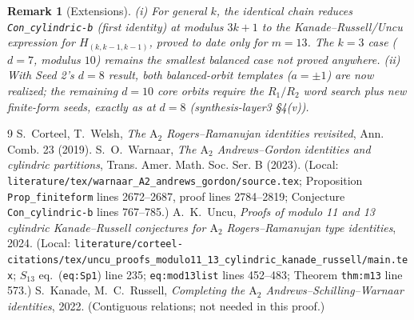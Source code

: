 \documentclass[11pt]{article}
\newtheorem{remark}[theorem]{Remark}
\begin{document}
\begin{remark}[Extensions]
(i) For general $k$, the identical chain reduces
\texttt{Con\_cylindric-b} (first identity) at modulus $3k+1$ to the
Kanade--Russell/Uncu expression for $H_{(k,k-1,k-1)}$, proved to date
only for $m=13$. The $k=3$ case ($d=7$, modulus $10$) remains the
smallest balanced case not proved anywhere.
(ii) With Seed 2's $d=8$ result, both balanced-orbit templates
($a=\pm1$) are now realized; the remaining $d=10$ core orbits require
the $R_1/R_2$ word search plus new finite-form seeds, exactly as at
$d=8$ (synthesis-layer3 \S4(v)).
\end{remark}

\begin{thebibliography}{9}
 S.~Corteel, T.~Welsh,
\emph{The $\mathrm{A}_2$ Rogers--Ramanujan identities revisited},
Ann. Comb. 23 (2019).
 S.~O.~Warnaar,
\emph{The $\mathrm{A}_2$ Andrews--Gordon identities and cylindric
partitions}, Trans. Amer. Math. Soc. Ser. B (2023).
(Local: \texttt{literature/tex/warnaar\_A2\_andrews\_gordon/source.tex};
Proposition \texttt{Prop\_finiteform} lines 2672--2687, proof lines
2784--2819; Conjecture \texttt{Con\_cylindric-b} lines 767--785.)
 A.~K.~Uncu,
\emph{Proofs of modulo 11 and 13 cylindric Kanade--Russell conjectures
for $\mathrm{A}_2$ Rogers--Ramanujan type identities}, 2024.
(Local: \texttt{literature/corteel-citations/tex/uncu\_proofs\_modulo11\_13\_cylindric\_kanade\_russell/main.tex};
$S_{13}$ eq.\ (\texttt{eq:Sp1}) line 235; \texttt{eq:mod13list} lines
452--483; Theorem \texttt{thm:m13} line 573.)
 S.~Kanade, M.~C.~Russell,
\emph{Completing the $\mathrm{A}_2$ Andrews--Schilling--Warnaar
identities}, 2022. (Contiguous relations; not needed in this proof.)
\end{thebibliography}
\end{document}
